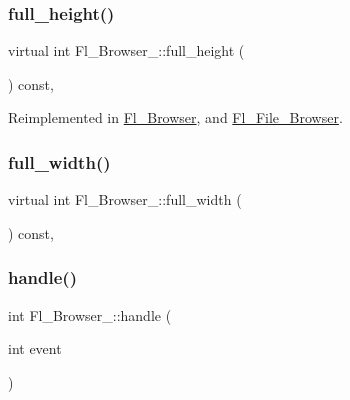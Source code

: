\mbox{\label{class_fl___browser___a16a8a583c790f87f852c6d10413e9592}} 
\subsubsection{\texorpdfstring{full\+\_\+height()}{full\_height()}}
{\footnotesize\ttfamily virtual int Fl\+\_\+\+Browser\+\_\+\+::full\+\_\+height (\begin{DoxyParamCaption}{ }\end{DoxyParamCaption}) const\hspace{0.3cm}{\ttfamily [protected]}, {\ttfamily [virtual]}}



Reimplemented in \hyperlink{class_fl___browser_aeadc4b1c149e211228f0cfaaf9df929f}{Fl\+\_\+\+Browser}, and \hyperlink{class_fl___file___browser_ad47103480abf8a727c37e2adaae19657}{Fl\+\_\+\+File\+\_\+\+Browser}.

\mbox{\label{class_fl___browser___a1a15e2abc969d5958d5ca0d7ae2d412b}} 
\subsubsection{\texorpdfstring{full\+\_\+width()}{full\_width()}}
{\footnotesize\ttfamily virtual int Fl\+\_\+\+Browser\+\_\+\+::full\+\_\+width (\begin{DoxyParamCaption}{ }\end{DoxyParamCaption}) const\hspace{0.3cm}{\ttfamily [protected]}, {\ttfamily [virtual]}}

\mbox{\label{class_fl___browser___a63015169440ce8d6c979abcc2a27d359}} 
\subsubsection{\texorpdfstring{handle()}{handle()}}
{\footnotesize\ttfamily int Fl\+\_\+\+Browser\+\_\+\+::handle (\begin{DoxyParamCaption}\item[{int}]{event }\end{DoxyParamCaption})\hspace{0.3cm}{\ttfamily [virtual]}}

